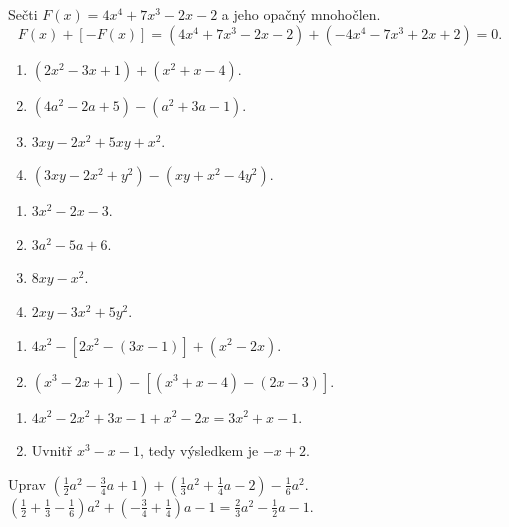 \documentclass[11pt,a4paper]{article}
\begin{document}
\begin{prikladReseniBox}[title={Příklad 4}]
Sečti $F(x)=4x^4+7x^3-2x-2$ a jeho opačný mnohočlen.
\tcblower
\[F(x)+[-F(x)]=(4x^4+7x^3-2x-2)+(-4x^4-7x^3+2x+2)=0.\]
\end{prikladReseniBox}
\begin{zadaniReseniBox}[title={Samostatná práce 1}]
\begin{enumerate}[label=\alph*)]
\item $(2x^2-3x+1)+(x^2+x-4)$.
\item $(4a^2-2a+5)-(a^2+3a-1)$.
\item $3xy-2x^2+5xy+x^2$.
\item $(3xy-2x^2+y^2)-(xy+x^2-4y^2)$.
\end{enumerate}
\tcblower
\begin{enumerate}[label=\alph*)]
\item $3x^2-2x-3$.
\item $3a^2-5a+6$.
\item $8xy-x^2$.
\item $2xy-3x^2+5y^2$.
\end{enumerate}
\end{zadaniReseniBox}
\begin{zadaniReseniBox}[title={Samostatná práce 2}]
\begin{enumerate}[label=\alph*)]
\item $4x^2-[2x^2-(3x-1)]+(x^2-2x)$.
\item $(x^3-2x+1)-[(x^3+x-4)-(2x-3)]$.
\end{enumerate}
\tcblower
\begin{enumerate}[label=\alph*)]
\item $4x^2-2x^2+3x-1+x^2-2x=3x^2+x-1$.
\item Uvnitř $x^3-x-1$, tedy výsledkem je $-x+2$.
\end{enumerate}
\end{zadaniReseniBox}
\begin{prikladReseniBox}[title={Příklad 5}]
Uprav $\left(\frac12a^2-\frac34a+1\right)+\left(\frac13a^2+\frac14a-2\right)-\frac16a^2$.
\tcblower
$\left(\frac12+\frac13-\frac16\right)a^2+\left(-\frac34+\frac14\right)a-1=\frac23a^2-\frac12a-1$.
\end{prikladReseniBox}
\end{document}
